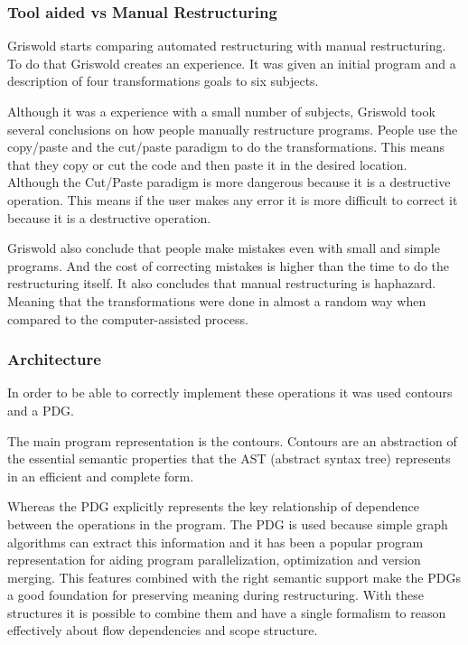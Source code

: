 \subsubsection{Tool aided vs Manual Restructuring}
Griswold starts comparing automated restructuring with manual restructuring. 
To do that Griswold creates an experience.
It was given an initial program and a description of four transformations goals to six subjects.%

Although it was a experience with a small number of subjects, Griswold took several conclusions on how people manually restructure programs.
People use the copy/paste and the cut/paste paradigm to do the transformations. 
This means that they copy or cut the code and then paste it in the desired location.
Although the Cut/Paste paradigm is more dangerous because it is a destructive operation. 
This means if the user makes any error it is more difficult to correct it because it is a destructive operation.

Griswold also conclude that people make mistakes even with small and simple programs. 
And the cost of correcting mistakes is higher than the time to do the restructuring itself. 
It also concludes that manual restructuring is haphazard. 
Meaning that the transformations were done in almost a random way when compared to the computer-assisted process.


\subsubsection{Architecture}

In order to be able to correctly implement these operations it was used contours and a PDG.

The main program representation is the contours. 
Contours are an abstraction of the essential semantic properties that the AST (abstract syntax tree) represents in an efficient and complete form.

Whereas the PDG explicitly represents the key relationship of dependence between the operations in the program. 
The PDG is used because simple graph algorithms can extract this information and it has been a popular program representation for aiding program parallelization, optimization and version merging.
This features combined with the right semantic support make the PDGs a good foundation for preserving meaning during restructuring.
With these structures it is possible to combine them and have a single formalism to reason effectively about flow dependencies and scope structure.

